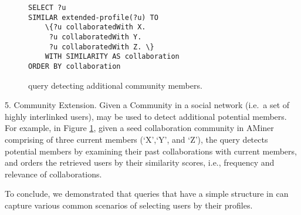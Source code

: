 \begin{figure}
	{\scriptsize
		\begin{Verbatim}
SELECT ?u
SIMILAR extended-profile(?u) TO
	\{?u collaboratedWith X. 
	 ?u collaboratedWith Y. 
	 ?u collaboratedWith Z. \}
	WITH SIMILARITY AS collaboration
ORDER BY collaboration
		\end{Verbatim}
	} \vspace{-6mm} \caption{\qlang{} query detecting additional community members.} \label{fig:community}
\end{figure}

\textsf{5. Community Extension.} 
Given a Community in a social network (i.e.\ a set of highly interlinked users), \qlang{} may be used to detect additional  potential members. For example, in Figure \ref{fig:community}, given a seed collaboration community in AMiner comprising of three current members (`X',`Y', and `Z'), the \qlang{} query detects potential members by examining their past collaborations with current members, and orders the retrieved users by their similarity scores, i.e., frequency and relevance of collaborations.


To conclude, we demonstrated that queries that have a simple structure in \qlang{} can capture various common scenarios of selecting users by their profiles.

